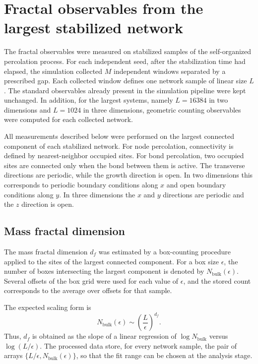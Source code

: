 \section{Fractal observables from the largest stabilized network}
\label{sec:fractal-counts-methods}

The fractal observables were measured on stabilized samples of the
self-organized percolation process.  For each independent seed, after the
stabilization time had elapsed, the simulation collected \(M\) independent
windows separated by a prescribed gap.  Each collected window defines one
network sample of linear size \(L\).  The standard observables already present
in the simulation pipeline were kept unchanged.  In addition, for the largest
systems, namely \(L=16384\) in two dimensions and \(L=1024\) in three
dimensions, geometric counting observables were computed for each collected
network.

All measurements described below were performed on the largest connected
component of each stabilized network.  For node percolation, connectivity is
defined by nearest-neighbor occupied sites.  For bond percolation, two occupied
sites are connected only when the bond between them is active.  The transverse
directions are periodic, while the growth direction is open.  In two
dimensions this corresponds to periodic boundary conditions along \(x\) and
open boundary conditions along \(y\).  In three dimensions the \(x\) and \(y\)
directions are periodic and the \(z\) direction is open.

\subsection{Mass fractal dimension}
\label{subsec:mass-fractal-dimension}

The mass fractal dimension \(d_f\) was estimated by a box-counting procedure
applied to the sites of the largest connected component.  For a box size
\(\epsilon\), the number of boxes intersecting the largest component is denoted
by \(N_{\mathrm{bulk}}(\epsilon)\).  Several offsets of the box grid were used
for each value of \(\epsilon\), and the stored count corresponds to the average
over offsets for that sample.

The expected scaling form is
\begin{equation}
    N_{\mathrm{bulk}}(\epsilon)
    \sim
    \left(\frac{L}{\epsilon}\right)^{d_f}.
    \label{eq:df-box-counting}
\end{equation}
Thus, \(d_f\) is obtained as the slope of a linear regression of
\(\log N_{\mathrm{bulk}}\) versus \(\log(L/\epsilon)\).  The processed data
store, for every network sample, the pair of arrays
\(\{L/\epsilon, N_{\mathrm{bulk}}(\epsilon)\}\), so that the fit range can be
chosen at the analysis stage.

